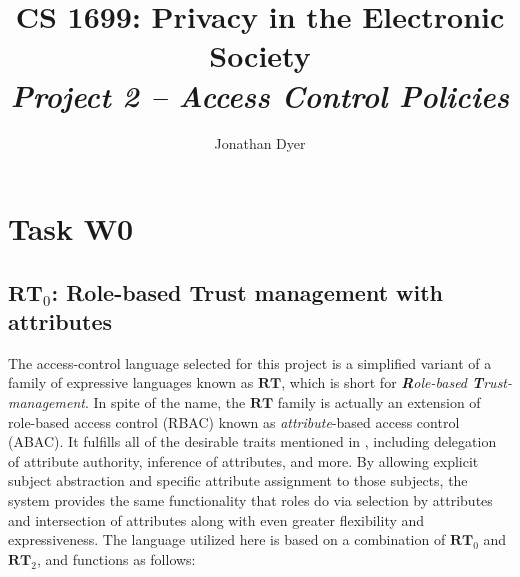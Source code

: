 \documentclass{article}
\author{Jonathan Dyer}
\title{CS 1699: Privacy in the Electronic Society \\
        \textit{Project 2 -- Access Control Policies}}
\providecommand{\task}[1]{\section{Task #1}}
\providecommand{\RT}{\textbf{RT}}
\begin{document}
\maketitle

\tableofcontents

\pagebreak

\task{W0}
\subsection{$\RT_0$: Role-based Trust management with attributes}
The access-control language selected for this project is a simplified variant of a family of expressive languages known as $\RT$, which is short for \textit{\textbf{R}ole-based \textbf{T}rust-management}.
In spite of the name, the $\RT$ family is actually an extension of role-based access control (RBAC) known as \textit{attribute}-based access control (ABAC).
It fulfills all of the desirable traits mentioned in \cite{RTmain}, including delegation of attribute authority, inference of attributes, and more.
By allowing explicit subject abstraction and specific attribute assignment to those subjects, the system provides the same functionality that roles do via selection by attributes and intersection of attributes along with even greater flexibility and expressiveness.
The language utilized here is based on a combination of $\RT_0$ and $\RT_2$, and functions as follows:
\end{document}
